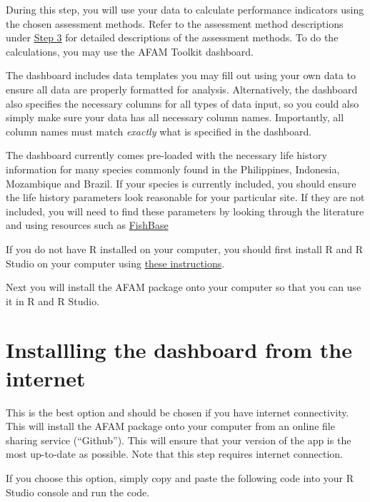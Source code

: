 \documentclass[]{book}
\begin{document}
During this step, you will use your data to calculate performance
indicators using the chosen assessment methods. Refer to the assessment
method descriptions under \protect\hyperlink{Step3}{Step 3} for detailed
descriptions of the assessment methods. To do the calculations, you may
use the AFAM Toolkit dashboard.

The dashboard includes data templates you may fill out using your own
data to ensure all data are properly formatted for analysis.
Alternatively, the dashboard also specifies the necessary columns for
all types of data input, so you could also simply make sure your data
has all necessary column names. Importantly, all column names must match
\emph{exactly} what is specified in the dashboard.

The dashboard currently comes pre-loaded with the necessary life history
information for many species commonly found in the Philippines,
Indonesia, Mozambique and Brazil. If your species is currently included,
you should ensure the life history parameters look reasonable for your
particular site. If they are not included, you will need to find these
parameters by looking through the literature and using resources such as
\href{www.fishbase.org}{FishBase}

If you do not have R installed on your computer, you should first
install R and R Studio on your computer using
\href{https://sfg-ucsb.github.io/fishery-manageR/}{these instructions}.

Next you will install the AFAM package onto your computer so that you
can use it in R and R Studio.

\section{Installling the dashboard from the
internet}\label{installling-the-dashboard-from-the-internet}

This is the best option and should be chosen if you have internet
connectivity. This will install the AFAM package onto your computer from
an online file sharing service (``Github''). This will ensure that your
version of the app is the most up-to-date as possible. Note that this
step requires internet connection.

If you choose this option, simply copy and paste the following code into
your R Studio console and run the code.
\end{document}
